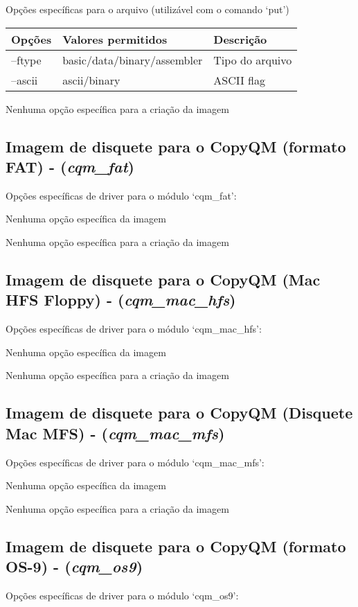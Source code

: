 \documentclass[letterpaper,10pt,brazil]{sphinxmanual}
\begin{document}
Opções específicas para o arquivo (utilizável com o comando `put')

\noindent\begin{tabulary}{\linewidth}{|L|L|L|}
\hline

Opções
&
Valores permitidos
&
Descrição
\\
\hline
--ftype
&
basic/data/binary/assembler
&
Tipo do arquivo
\\
\hline
--ascii
&
ascii/binary
&
ASCII flag
\\
\hline\end{tabulary}


Nenhuma opção específica para a criação da imagem


\subsection{Imagem de disquete para o CopyQM (formato FAT) - (\emph{cqm\_fat})}
\label{tools/imgtool:imagem-de-disquete-para-o-copyqm-formato-fat-cqm-fat}
Opções específicas de driver para o módulo `cqm\_fat':

Nenhuma opção específica da imagem

Nenhuma opção específica para a criação da imagem


\subsection{Imagem de disquete para o CopyQM (Mac HFS Floppy) - (\emph{cqm\_mac\_hfs})}
\label{tools/imgtool:imagem-de-disquete-para-o-copyqm-mac-hfs-floppy-cqm-mac-hfs}
Opções específicas de driver para o módulo `cqm\_mac\_hfs':

Nenhuma opção específica da imagem

Nenhuma opção específica para a criação da imagem


\subsection{Imagem de disquete para o CopyQM (Disquete Mac MFS) - (\emph{cqm\_mac\_mfs})}
\label{tools/imgtool:imagem-de-disquete-para-o-copyqm-disquete-mac-mfs-cqm-mac-mfs}
Opções específicas de driver para o módulo `cqm\_mac\_mfs':

Nenhuma opção específica da imagem

Nenhuma opção específica para a criação da imagem


\subsection{Imagem de disquete para o CopyQM (formato OS-9) - (\emph{cqm\_os9})}
\label{tools/imgtool:imagem-de-disquete-para-o-copyqm-formato-os-9-cqm-os9}
Opções específicas de driver para o módulo `cqm\_os9':
\end{document}
